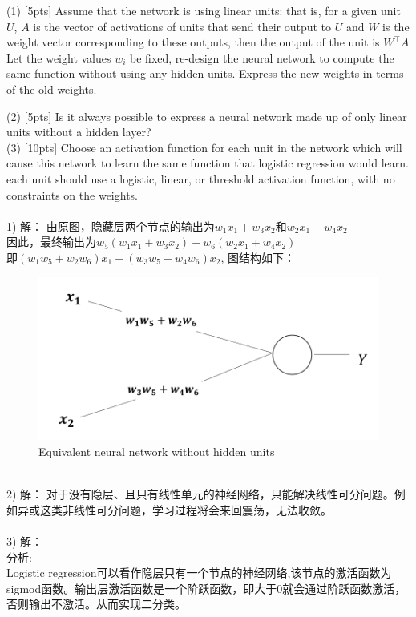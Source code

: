 \documentclass{article}
\begin{document}
	(1) [5pts] Assume that the network is using linear units: that is, for a given unit $U$, $A$ is the vector of activations of units that send their output to $U$ and $W$ is the weight vector corresponding to these outputs, then the output of the unit is $W^{\top}A$ Let the weight values $w_i$ be fixed, re-design the neural network to compute the same function without using any hidden units. Express the new weights in terms of the old weights.

	(2) [5pts] Is it always possible to express a neural network made up of only linear units without a hidden layer?\\
	
	(3) [10pts] Choose an activation function for each unit in the network which will cause this network to learn the same function that logistic regression would learn. each unit should use a logistic, linear, or threshold activation function, with no constraints on the weights.\\\\
	1) 解：
		由原图，隐藏层两个节点的输出为$w_1x_1+w_3x_2$和$w_2x_1+w_4x_2$\\
		因此，最终输出为$w_5(w_1x_1+w_3x_2)+w_6(w_2x_1+w_4x_2)$\\
		即$(w_1w_5+w_2w_6)x_1+(w_3w_5+w_4w_6)x_2$, 图结构如下：\\
		\begin{figure}[htbp]
			\centering
			\includegraphics[scale=0.5]{NeuralNetwork_2_1.png}
			\caption{Equivalent neural network without hidden units}
		\end{figure}
	\\
	2) 解：
		对于没有隐层、且只有线性单元的神经网络，只能解决线性可分问题。例如异或这类非线性可分问题，学习过程将会来回震荡，无法收敛。\\
	\\3) 解：\\
	分析:\\Logistic regression可以看作隐层只有一个节点的神经网络,该节点的激活函数为sigmod函数。输出层激活函数是一个阶跃函数，即大于0就会通过阶跃函数激活，否则输出不激活。从而实现二分类。\\\\
\end{document}
